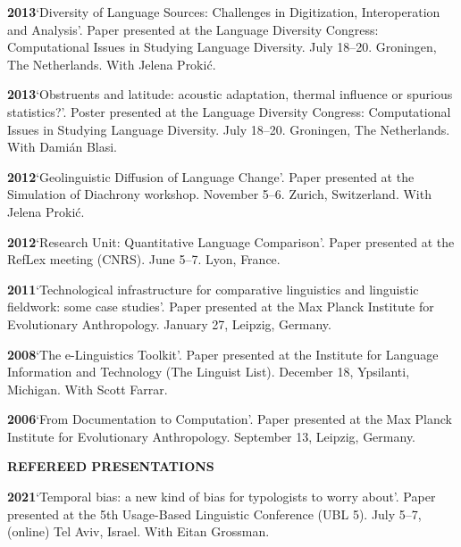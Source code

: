 \documentclass[11pt]{article}
\newcommand{\hangpara}{
 \setlength{\parindent}{0in} %
 \hangindent=0.42in %
}
\begin{document}
\vskip 6pt
\hangpara
{\bf 2013}\hspace{1ex}`Diversity of Language Sources: Challenges in Digitization, Interoperation and Analysis'. Paper presented at the Language Diversity Congress: Computational Issues in Studying Language Diversity. July 18--20. Groningen, The Netherlands. With Jelena Proki{\'c}.

\vskip 6pt
\hangpara
{\bf 2013}\hspace{1ex}`Obstruents and latitude: acoustic adaptation, thermal influence or spurious statistics?'. Poster presented at the Language Diversity Congress: Computational Issues in Studying Language Diversity. July 18--20. Groningen, The Netherlands. With Dami{\'a}n Blasi.

\vskip 6pt
\hangpara
{\bf 2012}\hspace{1ex}`Geolinguistic Diffusion of Language Change'. Paper presented at the Simulation of Diachrony workshop. November 5--6. Zurich, Switzerland. With Jelena Proki{\'c}.

\vskip 6pt
\hangpara
{\bf 2012}\hspace{1ex}`Research Unit: Quantitative Language Comparison'. Paper presented at the RefLex meeting (CNRS). June 5--7. Lyon, France. 

\vskip 6pt
\hangpara
{\bf 2011}\hspace{1ex}`Technological infrastructure for comparative linguistics and linguistic fieldwork: some case studies'. Paper presented at the Max Planck Institute for Evolutionary Anthropology. January 27, Leipzig, Germany. 

\vskip 6pt
\hangpara
{\bf 2008}\hspace{1ex}`The e-Linguistics Toolkit'. Paper presented at the Institute for Language Information and Technology (The Linguist List). December 18, Ypsilanti, Michigan. With Scott Farrar.

\vskip 6pt
\hangpara
{\bf 2006}\hspace{1ex}`From Documentation to Computation'. Paper presented at the Max Planck Institute for Evolutionary Anthropology. September 13, Leipzig, Germany.


\vskip 20pt
\begin{flushleft}
{\bf REFEREED PRESENTATIONS}
\end{flushleft}

\hangpara
{\bf 2021}\hspace{1ex}`Temporal bias: a new kind of bias for typologists to worry about'. Paper presented at the 5th Usage-Based Linguistic Conference (UBL 5). July 5--7, (online) Tel Aviv, Israel. With Eitan Grossman.
\end{document}
